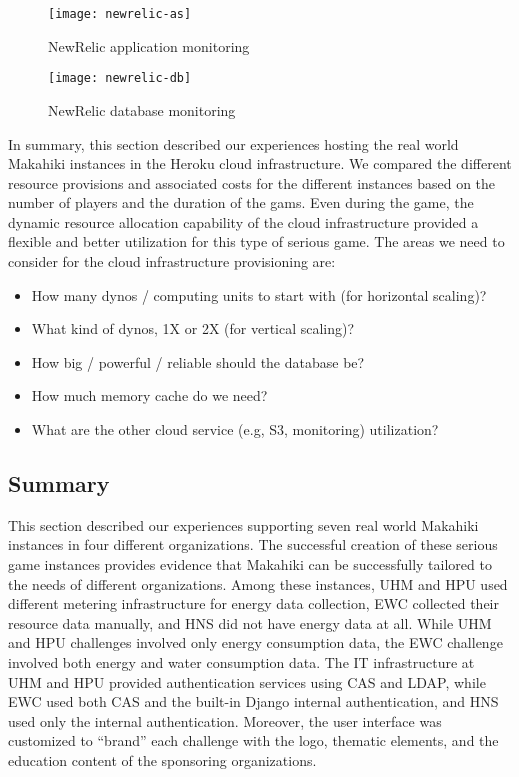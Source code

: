 \begin{figure}[ht!]
  \center
  \texttt{[image: newrelic-as]}
  \caption{NewRelic application monitoring}
  \label{fig:newrelic-as}
\end{figure}

\begin{figure}[ht!]
  \center
  \texttt{[image: newrelic-db]}
  \caption{NewRelic database monitoring}
  \label{fig:newrelic-db}
\end{figure}

In summary, this section described our experiences hosting the real world Makahiki instances in the Heroku cloud infrastructure. We compared the different resource provisions and associated costs for the different instances based on the number of players and the duration of the gams. Even during the game, the dynamic resource allocation capability of the cloud infrastructure provided a flexible and better utilization for this type of serious game. The areas we need to consider for the cloud infrastructure provisioning are:
\begin{itemize}
\item How many dynos / computing units to start with (for horizontal scaling)?
\item What kind of dynos, 1X or 2X (for vertical scaling)? 
\item How big / powerful / reliable should the database be? 
\item How much memory cache do we need?
\item What are the other cloud service (e.g, S3, monitoring) utilization?
\end{itemize}

\subsection{Summary}

This section described our experiences supporting seven real world Makahiki instances in four different organizations. The successful creation of these serious game instances provides evidence that Makahiki can be successfully tailored to the needs of different organizations. Among these instances, UHM and HPU used different metering infrastructure for energy data collection, EWC collected their resource data manually, and HNS did not have energy data at all. While UHM and HPU challenges involved only energy consumption data, the EWC challenge involved both energy and water consumption data. The IT infrastructure at UHM and HPU provided authentication services using CAS and LDAP, while EWC used both CAS and the built-in Django internal  authentication, and HNS used only the internal authentication. Moreover, the user interface was customized to ``brand'' each challenge with the logo, thematic elements, and the education content of the sponsoring organizations.

